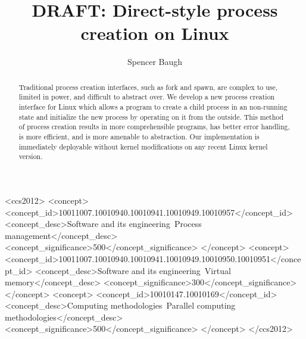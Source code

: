 \documentclass[sigplan]{acmart}
\begin{document}
\title[DRAFT: Direct-style process creation on Linux]{DRAFT: Direct-style process creation on Linux}

\author{Spencer Baugh}

\begin{abstract}
Traditional process creation interfaces,
such as fork and spawn,
are complex to use, limited in power, and difficult to abstract over.
We develop a new process creation interface for Linux
which allows a program to create a child process in an non-running state
and initialize the new process by operating on it from the outside.
This method of process creation results in more comprehensible programs, 
has better error handling,
is more efficient,
and is more amenable to abstraction.
Our implementation is immediately deployable without kernel modifications on any recent Linux kernel version.
\end{abstract}

%
%
\begin{CCSXML}
<ccs2012>
   <concept>
       <concept_id>10011007.10010940.10010941.10010949.10010957</concept_id>
       <concept_desc>Software and its engineering~Process management</concept_desc>
       <concept_significance>500</concept_significance>
       </concept>
   <concept>
       <concept_id>10011007.10010940.10010941.10010949.10010950.10010951</concept_id>
       <concept_desc>Software and its engineering~Virtual memory</concept_desc>
       <concept_significance>300</concept_significance>
       </concept>
   <concept>
       <concept_id>10010147.10010169</concept_id>
       <concept_desc>Computing methodologies~Parallel computing methodologies</concept_desc>
       <concept_significance>500</concept_significance>
       </concept>
 </ccs2012>
\end{CCSXML}



\maketitle
\end{document}
